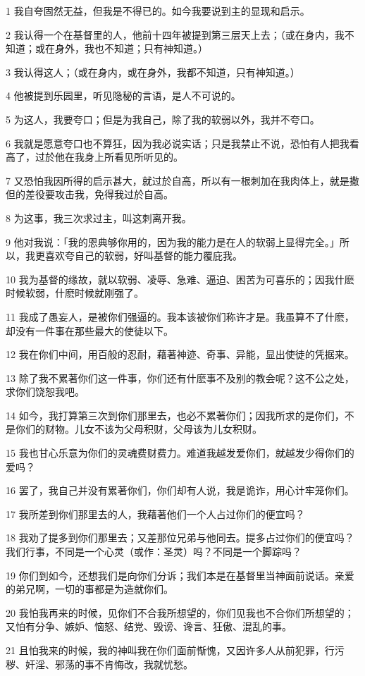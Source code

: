 \par 1 我自夸固然无益，但我是不得已的。如今我要说到主的显现和启示。
\par 2 我认得一个在基督里的人，他前十四年被提到第三层天上去；（或在身内，我不知道；或在身外，我也不知道；只有神知道。）
\par 3 我认得这人；（或在身内，或在身外，我都不知道，只有神知道。）
\par 4 他被提到乐园里，听见隐秘的言语，是人不可说的。
\par 5 为这人，我要夸口；但是为我自己，除了我的软弱以外，我并不夸口。
\par 6 我就是愿意夸口也不算狂，因为我必说实话；只是我禁止不说，恐怕有人把我看高了，过於他在我身上所看见所听见的。
\par 7 又恐怕我因所得的启示甚大，就过於自高，所以有一根刺加在我肉体上，就是撒但的差役要攻击我，免得我过於自高。
\par 8 为这事，我三次求过主，叫这刺离开我。
\par 9 他对我说：「我的恩典够你用的，因为我的能力是在人的软弱上显得完全。」所以，我更喜欢夸自己的软弱，好叫基督的能力覆庇我。
\par 10 我为基督的缘故，就以软弱、凌辱、急难、逼迫、困苦为可喜乐的；因我什麽时候软弱，什麽时候就刚强了。
\par 11 我成了愚妄人，是被你们强逼的。我本该被你们称许才是。我虽算不了什麽，却没有一件事在那些最大的使徒以下。
\par 12 我在你们中间，用百般的忍耐，藉著神迹、奇事、异能，显出使徒的凭据来。
\par 13 除了我不累著你们这一件事，你们还有什麽事不及别的教会呢？这不公之处，求你们饶恕我吧。
\par 14 如今，我打算第三次到你们那里去，也必不累著你们；因我所求的是你们，不是你们的财物。儿女不该为父母积财，父母该为儿女积财。
\par 15 我也甘心乐意为你们的灵魂费财费力。难道我越发爱你们，就越发少得你们的爱吗？
\par 16 罢了，我自己并没有累著你们，你们却有人说，我是诡诈，用心计牢笼你们。
\par 17 我所差到你们那里去的人，我藉著他们一个人占过你们的便宜吗？
\par 18 我劝了提多到你们那里去；又差那位兄弟与他同去。提多占过你们的便宜吗？我们行事，不同是一个心灵（或作：圣灵）吗？不同是一个脚踪吗？
\par 19 你们到如今，还想我们是向你们分诉；我们本是在基督里当神面前说话。亲爱的弟兄啊，一切的事都是为造就你们。
\par 20 我怕我再来的时候，见你们不合我所想望的，你们见我也不合你们所想望的；又怕有分争、嫉妒、恼怒、结党、毁谤、谗言、狂傲、混乱的事。
\par 21 且怕我来的时候，我的神叫我在你们面前惭愧，又因许多人从前犯罪，行污秽、奸淫、邪荡的事不肯悔改，我就忧愁。

